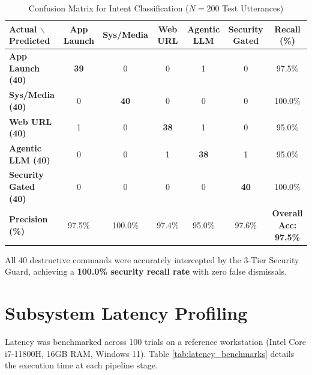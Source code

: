 \begin{table}[htbp]
\centering
\small
\caption{Confusion Matrix for Intent Classification ($N=200$ Test Utterances)}
\label{tab:confusion_matrix}
\begin{tabular}{|l|c|c|c|c|c|c|}
\hline
\textbf{Actual $\backslash$ Predicted} & \textbf{App Launch} & \textbf{Sys/Media} & \textbf{Web URL} & \textbf{Agentic LLM} & \textbf{Security Gated} & \textbf{Recall (\%)} \\ \hline
\textbf{App Launch (40)} & \textbf{39} & 0 & 0 & 1 & 0 & 97.5\% \\ \hline
\textbf{Sys/Media (40)} & 0 & \textbf{40} & 0 & 0 & 0 & 100.0\% \\ \hline
\textbf{Web URL (40)} & 1 & 0 & \textbf{38} & 1 & 0 & 95.0\% \\ \hline
\textbf{Agentic LLM (40)} & 0 & 0 & 1 & \textbf{38} & 1 & 95.0\% \\ \hline
\textbf{Security Gated (40)} & 0 & 0 & 0 & 0 & \textbf{40} & 100.0\% \\ \hline
\textbf{Precision (\%)} & 97.5\% & 100.0\% & 97.4\% & 95.0\% & 97.6\% & \textbf{Overall Acc: 97.5\%} \\ \hline
\end{tabular}
\end{table}

All 40 destructive commands were accurately intercepted by the 3-Tier Security Guard, achieving a \textbf{100.0\% security recall rate} with zero false dismissals.

\section{Subsystem Latency Profiling}
Latency was benchmarked across 100 trials on a reference workstation (Intel Core i7-11800H, 16GB RAM, Windows 11). Table \ref{tab:latency_benchmarks} details the execution time at each pipeline stage.

